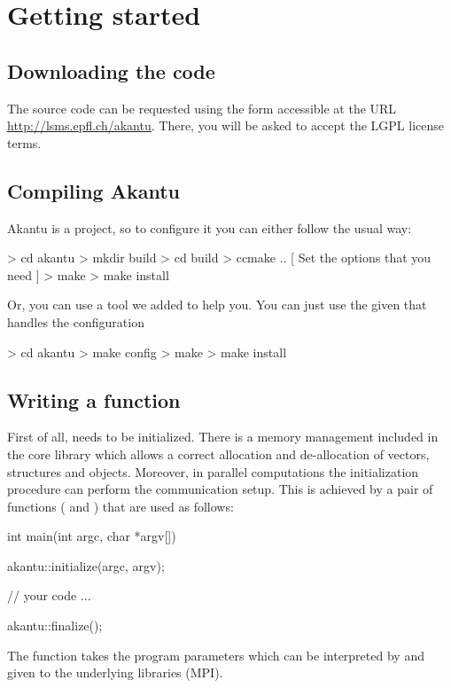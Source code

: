\chapter{Getting started}
\section{Downloading the code}

The \akantu source code can be requested using the form accessible at the URL
\url{http://lsms.epfl.ch/akantu}.  There, you will be asked to accept the LGPL
license terms.

\section{Compiling Akantu}

Akantu is a  project, so to configure it you can either follow the usual way:
\begin{command}
  > cd akantu
  > mkdir build
  > cd build
  > ccmake ..
  [ Set the options that you need ]
  > make
  > make install
\end{command}

Or, you can use a tool  we added to help you. You can just use the
given  that handles the  configuration

\begin{command}
  > cd akantu
  > make config
  > make
  > make install
\end{command}

\section{Writing a  function\label{sect:common:main}}

First of all, \akantu needs to be initialized.  There is a memory
management included in the core library which allows a correct
allocation and de-allocation of vectors, structures and
objects. Moreover, in parallel computations the initialization
procedure can perform the communication setup. This is achieved by
 a pair of functions ( and )
that are used as follows:
\begin{cpp}
int main(int argc, char *argv[])
{
  akantu::initialize(argc, argv);

  // your code
  ...

  akantu::finalize();
}
\end{cpp}
The  function takes the program parameters which
can be interpreted by \akantu and given to the underlying libraries (\eg MPI).

